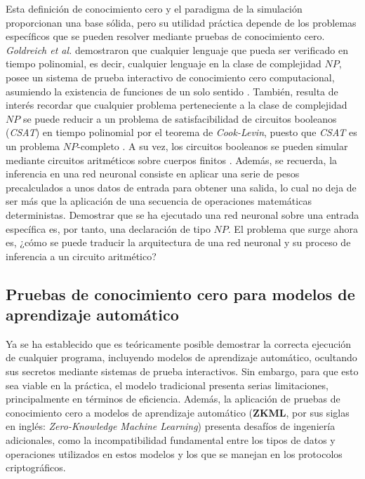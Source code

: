 \documentclass[a4paper, 11pt]{article}
\begin{document}
Esta definición de conocimiento cero y el paradigma de la simulación proporcionan una base sólida,
pero su utilidad práctica depende de los problemas específicos que se pueden resolver mediante
pruebas de conocimiento cero. \textit{Goldreich et al.} demostraron que cualquier lenguaje que pueda
ser verificado en tiempo polinomial, es decir, cualquier lenguaje en la clase de complejidad $NP$,
posee un sistema de prueba interactivo de conocimiento cero computacional, asumiendo la existencia
de funciones de un solo sentido \cite{goldreich1991proofs}. También, resulta de interés recordar que
cualquier problema perteneciente a la clase de complejidad $NP$ se puede reducir a un problema de
satisfacibilidad de circuitos booleanos (\textit{CSAT}) en tiempo polinomial por el teorema de
\textit{Cook-Levin}, puesto que \textit{CSAT} es un problema $NP$-completo \cite{cook1971complexity, levin1973universal}.
A su vez, los circuitos booleanos se pueden simular mediante circuitos aritméticos sobre cuerpos finitos
\cite[Capítulo~4]{thaler2022proofs}. Además, se recuerda, la inferencia en una red neuronal consiste
en aplicar una serie de pesos precalculados a unos datos de entrada para obtener una salida, lo cual
no deja de ser más que la aplicación de una secuencia de operaciones matemáticas deterministas. Demostrar
que se ha ejecutado una red neuronal sobre una entrada específica es, por tanto, una declaración de tipo $NP$.
El problema que surge ahora es, ¿cómo se puede traducir la arquitectura de una red neuronal y su proceso
de inferencia a un circuito aritmético?

\subsection{Pruebas de conocimiento cero para modelos de aprendizaje automático} \label{zkml}

Ya se ha establecido que es teóricamente posible demostrar la correcta ejecución de cualquier programa,
incluyendo modelos de aprendizaje automático, ocultando sus secretos mediante sistemas de prueba
interactivos. Sin embargo, para que esto sea viable en la práctica, el modelo tradicional presenta
serias limitaciones, principalmente en términos de eficiencia. Además, la aplicación de pruebas de
conocimiento cero a modelos de aprendizaje automático (\textbf{ZKML}, por sus siglas en inglés:
\textit{Zero-Knowledge Machine Learning}) presenta desafíos de ingeniería adicionales, como la
incompatibilidad fundamental entre los tipos de datos y operaciones utilizados en estos modelos y
los que se manejan en los protocolos criptográficos.
\end{document}
